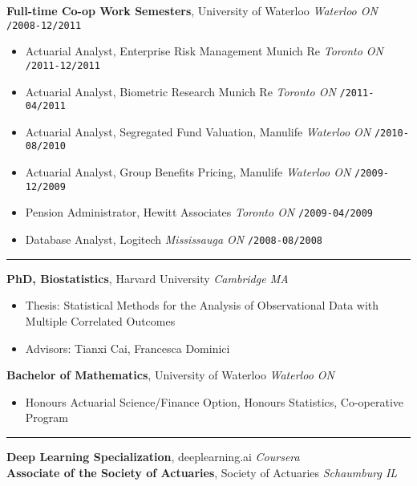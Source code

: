 \documentclass[10pt,english]{report}
\begin{document}
\textbf{Full-time Co-op Work Semesters}, University of Waterloo \hfill \textit{Waterloo ON} \texttt{/2008-12/2011}
\begin{itemize}
\item Actuarial Analyst, Enterprise Risk Management Munich Re \hfill \textit{Toronto ON} \texttt{/2011-12/2011}
\item Actuarial Analyst, Biometric Research Munich Re \hfill \textit{Toronto ON} \texttt{/2011-04/2011}
\item Actuarial Analyst, Segregated Fund Valuation, Manulife \hfill \textit{Waterloo ON} \texttt{/2010-08/2010}
\item Actuarial Analyst, Group Benefits Pricing, Manulife \hfill \textit{Waterloo ON} \texttt{/2009-12/2009}
\item Pension Administrator, Hewitt Associates \hfill \textit{Toronto ON} \texttt{/2009-04/2009}
\item Database Analyst, Logitech \hfill \textit{Mississauga ON} \texttt{/2008-08/2008}
\end{itemize}

\vspace{5mm}

{\par}
\vspace{1mm}\hrule
\vspace{1mm}

\textbf{PhD, Biostatistics}, Harvard University \hfill \textit{Cambridge MA} \texttt{}
\begin{itemize}
\item Thesis: Statistical Methods for the Analysis of Observational Data with Multiple Correlated Outcomes
\item Advisors: Tianxi Cai, Francesca Dominici
\end{itemize}

\vspace{1mm}

\textbf{Bachelor of Mathematics}, University of Waterloo \hfill \textit{Waterloo ON} \texttt{}
\begin{itemize}
\item Honours Actuarial Science/Finance Option, Honours Statistics, Co-operative
Program
\end{itemize}

\vspace{1mm}
\vspace{1mm}\hrule
\vspace{1mm}

\textbf{Deep Learning Specialization}, deeplearning.ai \hfill \textit{Coursera} \texttt{} \\
\textbf{Associate of the Society of Actuaries}, Society of Actuaries \hfill \textit{Schaumburg IL} \texttt{}
\end{document}
